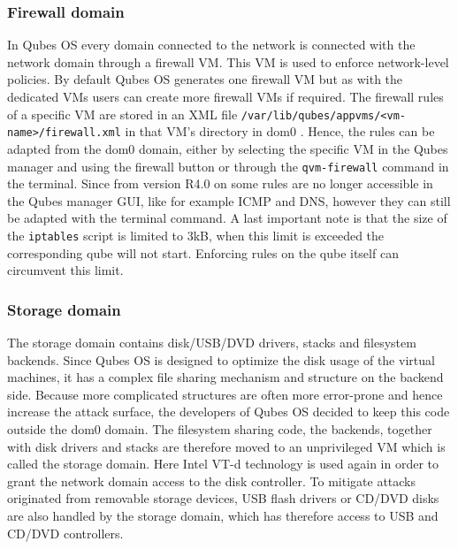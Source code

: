 \documentclass[runningheads,a4paper]{article}
\begin{document}
\subsubsection{Firewall domain}

In Qubes OS every domain connected to the network is connected with
the network domain through a firewall VM. This VM is used to enforce
network-level policies. By default Qubes OS generates one firewall VM
but as with the dedicated VMs users can create more firewall VMs if
required. The firewall rules of a specific VM are stored in an XML
file \texttt{/var/lib/qubes/appvms/<vm-name>/firewall.xml} in that VM's
directory in dom0 . Hence, the rules can be adapted from the dom0
domain, either by selecting the specific VM in the Qubes manager and
using the firewall button or through the \texttt{qvm-firewall} command
in the terminal. Since from version R4.0 on some rules are no longer
accessible in the Qubes manager GUI, like for example ICMP and DNS,
however they can still be adapted with the terminal command. A last
important note is that the size of the \texttt{iptables} script is
limited to 3kB, when this limit is exceeded the corresponding qube will
not start. Enforcing rules on the qube itself can circumvent this
limit. %

\subsubsection{Storage domain}

The storage domain contains disk/USB/DVD drivers, stacks and
filesystem backends. Since Qubes OS is designed to optimize the disk
usage of the virtual machines, it has a complex file sharing mechanism
and structure on the backend side. Because more complicated structures
are often more error-prone and hence increase the attack surface, the
developers of Qubes OS decided to keep this code outside the dom0
domain. The filesystem sharing code, the backends, together with disk
drivers and stacks are therefore moved to an unprivileged VM which is
called the storage domain. Here Intel VT-d technology is used again in 
order to grant the network domain access to the disk controller. To
mitigate attacks originated from removable storage devices, USB flash
drivers or CD/DVD disks are also handled by the storage domain, which
has therefore access to USB and CD/DVD controllers.
\end{document}

